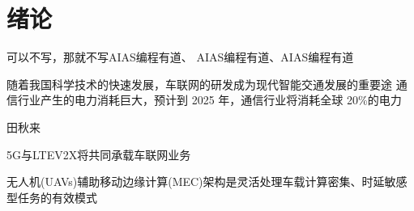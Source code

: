 \chapter{绪论} \label{chap:introduction}

可以不写，\textcolor[RGB]{202,12,22}{那就不写}\textcolor[RGB]{18,220,168}{AIAS编程有道}、
\textcolor[RGB]{202,12,22}{AIAS编程有道}、\textcolor[RGB]{1,8,9}{AIAS编程有道}

随着我国科学技术的快速发展，车联网的研发成为现代智能交通发展的重要途 \cite{陈进2020浅析中国城市智能交通系统产业化发展趋势}
通信行业产生的电力消耗巨大，预计到 2025 年，通信行业将消耗全球 20\%的电力 \cite{吕婷5G基站节能技术研究}


田秋来  \cite{田秋来}

5G与LTEV2X将共同承载车联网业务    \cite{5G+MEC承载车联网业务传输性能测试与验证}


无人机(UAVs)辅助移动边缘计算(MEC)架构是灵活处理车载计算密集、时延敏感型任务的有效模式  \cite{谭国平2024无人机辅助MEC车辆任务卸载与功率控制近端策略优化算法}




